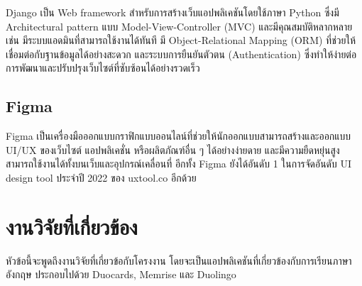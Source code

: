 \documentclass[12pt,oneside,openright,a4paper]{cpe-thai-project}
\begin{document}
\hspace{1cm}
Django \cite{Django} เป็น Web framework สำหรับการสร้างเว็บแอปพลิเคชันโดยใช้ภาษา Python ซึ่งมี Architectural pattern
แบบ Model-View-Controller (MVC) และมีคุณสมบัติหลากหลาย เช่น มีระบบแอดมินที่สามารถใช้งานได้ทันที
มี Object-Relational Mapping (ORM) ที่ช่วยให้เชื่อมต่อกับฐานข้อมูลได้อย่างสะดวก และระบบการยืนยันตัวตน (Authentication)
ซึ่งทำให้ง่ายต่อการพัฒนาและปรับปรุงเว็บไซต์ที่ซับซ้อนได้อย่างรวดเร็ว

\subsection{Figma}

\hspace{1cm}
Figma \cite{Figma} เป็นเครื่องมือออกแบบกราฟิกแบบออนไลน์ที่ช่วยให้นักออกแบบสามารถสร้างและออกแบบ UI/UX ของเว็บไซต์
แอปพลิเคชั่น หรือผลิตภัณฑ์อื่น ๆ ได้อย่างง่ายดาย และมีความยืดหยุ่นสูง สามารถใช้งานได้ทั้งบนเว็บและอุปกรณ์เคลื่อนที่
อีกทั้ง Figma ยังได้อันดับ 1 ในการจัดอันดับ UI design tool ประจำปี 2022 ของ uxtool.co อีกด้วย

\pagebreak
\section{งานวิจัยที่เกี่ยวข้อง}

\hspace{1cm}
หัวข้อนี้จะพูดถึงงานวิจัยที่เกี่ยวข้อกับโครงงาน โดยจะเป็นแอปพลิเคชันที่เกี่ยวข้องกับการเรียนภาษาอังกฤษ
ประกอบไปด้วย Duocards, Memrise และ Duolingo
\end{document}
